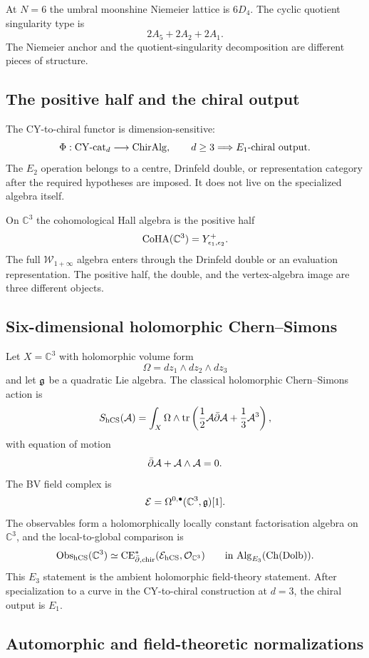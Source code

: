 At $N=6$ the umbral moonshine Niemeier lattice is $6D_4$.  The cyclic
quotient singularity type is
\[
  2A_5+2A_2+2A_1 .
\]
The Niemeier anchor and the quotient-singularity decomposition are
different pieces of structure.

\subsection{The positive half and the chiral output}
\label{wn:subsec:k3e-positive-half}

The CY-to-chiral functor is dimension-sensitive:
\[
  \Phi:\mathrm{CY}\text{-cat}_d\longrightarrow \mathrm{ChirAlg},
  \qquad d\geq 3 \Longrightarrow E_1\text{-chiral output}.
\]
The $E_2$ operation belongs to a centre, Drinfeld double, or
representation category after the required hypotheses are imposed.  It
does not live on the specialized algebra itself.

On $\mathbb C^3$ the cohomological Hall algebra is the positive half
\[
  \mathrm{CoHA}(\mathbb C^3)=Y^+_{\epsilon_1,\epsilon_2} .
\]
The full $\mathcal W_{1+\infty}$ algebra enters through the Drinfeld
double or an evaluation representation.  The positive half,
the double, and the vertex-algebra image are three different objects.

\subsection{Six-dimensional holomorphic Chern--Simons}
\label{wn:subsec:k3e-hcs}

Let $X=\mathbb C^3$ with holomorphic volume form
\[
  \Omega=dz_1\wedge dz_2\wedge dz_3
\]
and let $\mathfrak{g}$ be a quadratic Lie algebra.  The classical holomorphic
Chern--Simons action is
\[
  S_{\mathrm{hCS}}(\mathcal{A})=
  \int_X\Omega\wedge
  \operatorname{tr}\left(\frac12\mathcal{A}\bar\partial\mathcal{A}
  +\frac13\mathcal{A}^3\right),
\]
with equation of motion
\[
  \bar\partial\mathcal{A}+\mathcal{A}\wedge\mathcal{A}=0.
\]
The BV field complex is
\[
  \mathcal{E}=\Omega^{0,\bullet}(\mathbb C^3,\mathfrak{g})[1].
\]
The observables form a holomorphically locally constant factorisation
algebra on $\mathbb C^3$, and the local-to-global comparison is
\[
  \mathrm{Obs}_{\mathrm{hCS}}(\mathbb C^3)\simeq
  \mathrm{CE}^*_{\bar\partial,\mathrm{chir}}(\mathcal{E}_{\mathrm{hCS}},\mathcal{O}_{\mathbb C^3})
  \qquad
  \text{in }\mathrm{Alg}_{E_3}(\mathrm{Ch}(\mathrm{Dolb})).
\]
This $E_3$ statement is the ambient holomorphic field-theory statement.
After specialization to a curve in the CY-to-chiral construction at
$d=3$, the chiral output is $E_1$.

\subsection{Automorphic and field-theoretic normalizations}
\label{wn:subsec:k3e-normalizations}


